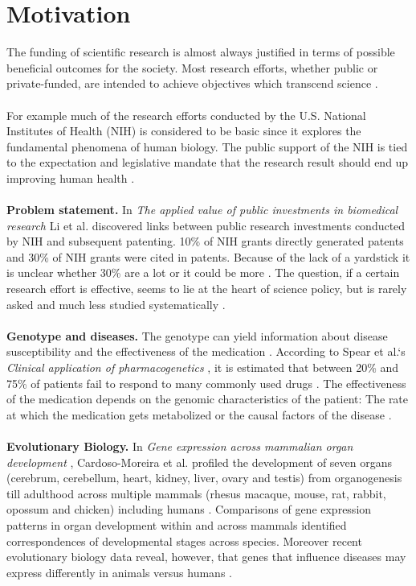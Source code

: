 \documentclass[11pt,titlepage,oneside,openany]{book}
\begin{document}
\section{Motivation}
The funding of scientific research is almost always justified in terms of possible beneficial outcomes for the society. Most research efforts, whether public or private-funded, are intended to achieve objectives which transcend science \cite{Sarewitz2007TheNH}.
\\
\\
For example much of the research efforts conducted by the U.S. National Institutes of Health (NIH) is considered to be basic since it explores the fundamental phenomena of human biology. The public support of the NIH is tied to the expectation and legislative mandate that the research result should end up improving human health \cite{Sarewitz2007TheNH}. 
\\
\\
\textbf{Problem statement.} In \textit{The applied value of public investments in biomedical research}\cite{Li2017TheAV} Li et al. discovered links between public research investments conducted by NIH and subsequent patenting. 10\% of NIH grants directly generated patents and 30\% of NIH grants were cited in patents. Because of the lack of a yardstick it is unclear whether 30\% are a lot or it could be more \cite{Li2017TheAV}. The question, if a certain research effort is effective, seems to lie at the heart of science policy, but is rarely asked and much less studied systematically \cite{Sarewitz2007TheNH}.
\\
\\
\textbf{Genotype and diseases.} The genotype can yield information about disease susceptibility and the effectiveness of the medication \cite{Brunicardi2011OverviewOT}. According to Spear et al.`s \textit{Clinical application of pharmacogenetics} \cite{Spear2001ClinicalAO}, it is estimated that between 20\% and 75\% of patients fail to respond to many commonly used drugs \cite{Spear2001ClinicalAO}. The effectiveness of the medication depends on the genomic characteristics of the patient: The rate at which the medication gets metabolized or the causal factors of the disease \cite{Brunicardi2011OverviewOT}.
\\
\\
\textbf{Evolutionary Biology.} In \textit{Gene expression across mammalian organ development} \cite{CardosoMoreira2019GeneEA}, Cardoso-Moreira et al. profiled the development of seven organs (cerebrum, cerebellum, heart, kidney, liver, ovary and testis) from organogenesis till adulthood across multiple mammals (rhesus macaque, mouse, rat, rabbit, opossum and chicken) including humans \cite{CardosoMoreira2019GeneEA}. Comparisons of gene expression patterns in organ development within and across mammals identified correspondences of developmental stages across species. Moreover recent evolutionary biology data reveal, however, that genes that influence diseases may express differently in animals versus humans \cite{CardosoMoreira2019GeneEA}.
\end{document}

